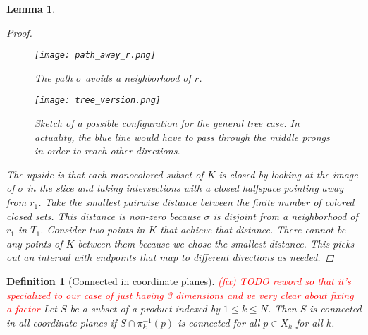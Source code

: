 \documentclass{article}
\newcommand{\fix}[1]{\textcolor{red}{(fix) #1}}
\theoremstyle{mystyle}
\newtheorem{lem}[thm]{Lemma}
\newtheorem{defn}[thm]{Definition}
\theoremstyle{remark}
\begin{document}
\begin{lem}
\begin{proof}
\begin{figure}[!h]
    \centering
    \texttt{[image: path\_away\_r.png]}
    \caption{The path $\sigma$ avoids a neighborhood of $r$.}
    \label{fig:square}
\end{figure}

\begin{figure}[!h]
    \centering
    \texttt{[image: tree\_version.png]}
    \caption{Sketch of a possible configuration for the general tree case. In actuality, the blue line would have to pass through the middle prongs in order to reach other directions.}
    \label{fig:square}
\end{figure}

        The upside is that each monocolored subset of \(K\) is closed by looking at the image of \(\sigma\) in the slice and taking intersections with a closed halfspace pointing away from \(r_{1}\). Take the smallest pairwise distance between the finite number of colored closed sets. This distance is non-zero because \(\sigma\) is disjoint from a neighborhood of $r_1$ in $T_1$. Consider two points in \(K\) that achieve that distance. There cannot be any points of \(K\) between them because we chose the smallest distance. This picks out an interval with endpoints that map to different directions as needed.
     \end{proof}
 

\end{lem}


\begin{defn}
    [Connected in coordinate planes]
    \label{defn:ccp} 
    \fix{ TODO reword so that it's specialized to our case of just having 3 dimensions and ve very clear about fixing a factor}
    Let \(S\) be a subset of a product indexed by \(1 \leq k \leq N\). Then \(S\) is connected in all coordinate planes if \(S \cap \pi_{k}^{-1} (p)\) is connected for all \(p \in X_{k}\) for all \(k\).
    
\end{defn}
\end{document}
